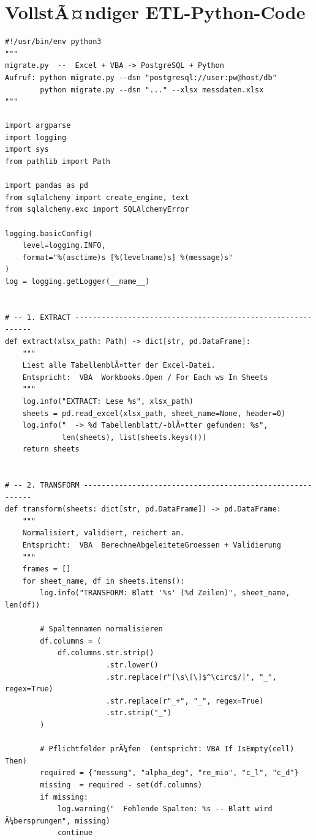 ﻿\documentclass[12pt,a4paper]{report}
\theoremstyle{definition}
\theoremstyle{remark}
\begin{document}
\section{VollstÃ¤ndiger ETL-Python-Code}

\begin{lstlisting}[style=python, caption={migrate.py: VollstÃ¤ndige ETL-Pipeline}, label=lst:etl]
#!/usr/bin/env python3
"""
migrate.py  --  Excel + VBA -> PostgreSQL + Python
Aufruf: python migrate.py --dsn "postgresql://user:pw@host/db"
        python migrate.py --dsn "..." --xlsx messdaten.xlsx
"""

import argparse
import logging
import sys
from pathlib import Path

import pandas as pd
from sqlalchemy import create_engine, text
from sqlalchemy.exc import SQLAlchemyError

logging.basicConfig(
    level=logging.INFO,
    format="%(asctime)s [%(levelname)s] %(message)s"
)
log = logging.getLogger(__name__)


# -- 1. EXTRACT ------------------------------------------------------------
def extract(xlsx_path: Path) -> dict[str, pd.DataFrame]:
    """
    Liest alle TabellenblÃ¤tter der Excel-Datei.
    Entspricht:  VBA  Workbooks.Open / For Each ws In Sheets
    """
    log.info("EXTRACT: Lese %s", xlsx_path)
    sheets = pd.read_excel(xlsx_path, sheet_name=None, header=0)
    log.info("  -> %d Tabellenblatt/-blÃ¤tter gefunden: %s",
             len(sheets), list(sheets.keys()))
    return sheets


# -- 2. TRANSFORM ----------------------------------------------------------
def transform(sheets: dict[str, pd.DataFrame]) -> pd.DataFrame:
    """
    Normalisiert, validiert, reichert an.
    Entspricht:  VBA  BerechneAbgeleiteteGroessen + Validierung
    """
    frames = []
    for sheet_name, df in sheets.items():
        log.info("TRANSFORM: Blatt '%s' (%d Zeilen)", sheet_name, len(df))

        # Spaltennamen normalisieren
        df.columns = (
            df.columns.str.strip()
                       .str.lower()
                       .str.replace(r"[\s\[\]$^\circ$/]", "_", regex=True)
                       .str.replace(r"_+", "_", regex=True)
                       .str.strip("_")
        )

        # Pflichtfelder prÃ¼fen  (entspricht: VBA If IsEmpty(cell) Then)
        required = {"messung", "alpha_deg", "re_mio", "c_l", "c_d"}
        missing  = required - set(df.columns)
        if missing:
            log.warning("  Fehlende Spalten: %s -- Blatt wird Ã¼bersprungen", missing)
            continue


\end{lstlisting}
\end{document}
